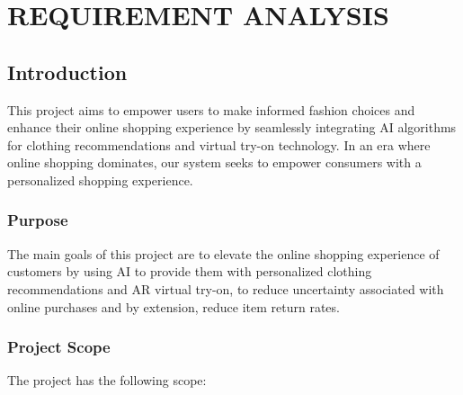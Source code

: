 \chapter[Requirement Analysis]{REQUIREMENT ANALYSIS}

\section{Introduction}
	This project aims to empower users to make informed fashion choices and enhance their online shopping experience by seamlessly integrating AI algorithms for clothing recommendations and virtual try-on technology. In an era where online shopping dominates, our system seeks to empower consumers with a personalized shopping experience.

	\subsection{Purpose}
		The main goals of this project are to elevate the online shopping experience of customers by using AI to provide them with personalized clothing recommendations and AR virtual try-on, to reduce uncertainty associated with online purchases and by extension, reduce item return rates.

	\subsection{Project Scope}
		The project has the following scope:

